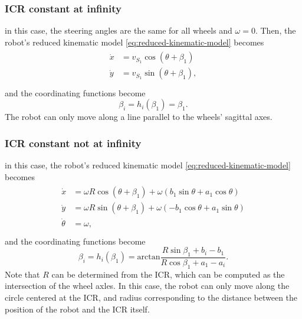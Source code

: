 \subsubsection{ICR constant at infinity}
\label{sec:icr-constant-at-infinity}
in this case, the steering angles are the same for all wheels and $\omega = 0$.
Then, the robot's reduced kinematic model \eqref{eq:reduced-kinematic-model} becomes
\begin{align}
\label{eq:icr-constant-at-infinity-kinematic-model}
\begin{split}
    \dot{x} &= v_{S_1} \cos(\theta + \beta_1) \\
    \dot{y} &= v_{S_1} \sin(\theta + \beta_1), \\
\end{split}
\end{align}
and the coordinating functions become
\begin{equation*}
    \beta_i = h_i(\beta_1) = \beta_1.
\end{equation*}
The robot can only move along a line parallel to the wheels' sagittal axes.

\subsubsection{ICR constant not at infinity}
\label{sec:icr-constant-not-at-infinity}
in this case, the robot's reduced kinematic model \eqref{eq:reduced-kinematic-model} becomes
\begin{align}
\label{eq:icr-constant-not-at-infinity-kinematic-model}
\begin{split}
    \dot{x} &= \omega R \cos(\theta + \beta_1) + \omega (b_1 \sin\theta + a_1 \cos\theta) \\
    \dot{y} &= \omega R \sin(\theta + \beta_1) + \omega (-b_1 \cos\theta + a_1 \sin\theta) \\
    \dot{\theta} &= \omega, \\
\end{split}
\end{align}
and the coordinating functions become
\begin{equation*}
    \beta_i = h_i(\beta_1) = \mathrm{arctan}\frac{R \sin\beta_1 + b_i - b_1}{R \cos\beta_1 + a_1 - a_i}.
\end{equation*}
Note that $R$ can be determined from the ICR, which can be computed as the
intersection of the wheel axles. In this case, the robot can only move along
the circle centered at the ICR, and radius corresponding to the distance between
the position of the robot and the ICR itself.

